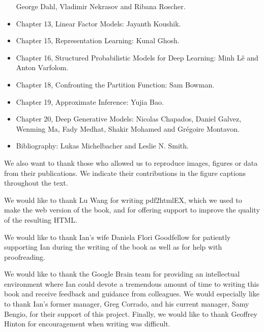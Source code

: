 \begin{itemize}
George Dahl, Vladimir Nekrasov and Ribana Roscher.
\item  Chapter 13, Linear Factor Models:
Jayanth Koushik.
\item Chapter 15, Representation Learning:
    Kunal Ghosh.
\item  Chapter 16,   Structured Probabilistic Models for Deep Learning: 
    Minh Lê and Anton Varfolom.
\item Chapter 18, Confronting the Partition Function: 
	Sam Bowman.
\item Chapter 19, Approximate Inference: 
Yujia Bao.
\item Chapter 20,  Deep Generative Models: 
Nicolas Chapados, Daniel Galvez, Wenming Ma, Fady Medhat, Shakir Mohamed and Gr\'egoire Montavon.
\item Bibliography:
Lukas Michelbacher and Leslie N. Smith.
\end{itemize}

We also want to thank those who allowed us to reproduce images, figures or data from
their publications.
We indicate their contributions
in the figure captions throughout the text.

We would like to thank Lu Wang for writing pdf2htmlEX, which we used
to make the web version of the book, and for offering support to
improve the quality of the resulting HTML.

We would like to thank Ian's wife Daniela Flori Goodfellow for
patiently supporting Ian during the writing of the book as well as for
help with proofreading.

We would like to thank the Google Brain team for providing an
intellectual environment where Ian could devote a tremendous amount of
time to writing this book and receive feedback and guidance from
colleagues. We would especially like to thank Ian's former manager,
Greg Corrado, and his current manager, Samy Bengio, for their support
of this project. Finally, we would like to thank Geoffrey Hinton for
encouragement when writing was difficult.
